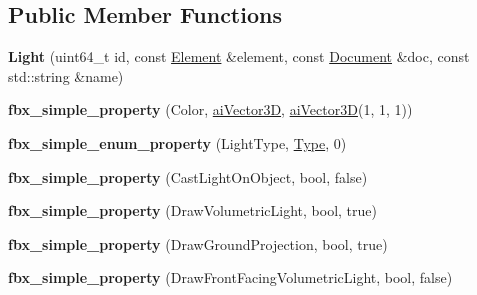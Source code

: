 \subsection*{Public Member Functions}
\begin{DoxyCompactItemize}
\item 
\hypertarget{class_assimp_1_1_f_b_x_1_1_light_a3c9266cb3d4fa03bb780329b565cfc11}{{\bfseries Light} (uint64\+\_\+t id, const \hyperlink{class_assimp_1_1_f_b_x_1_1_element}{Element} \&element, const \hyperlink{class_assimp_1_1_f_b_x_1_1_document}{Document} \&doc, const std\+::string \&name)}\label{class_assimp_1_1_f_b_x_1_1_light_a3c9266cb3d4fa03bb780329b565cfc11}

\item 
\hypertarget{class_assimp_1_1_f_b_x_1_1_light_a427a6078fe274cb5efb602206e0135d5}{{\bfseries fbx\+\_\+simple\+\_\+property} (Color, \hyperlink{structai_vector3_d}{ai\+Vector3\+D}, \hyperlink{structai_vector3_d}{ai\+Vector3\+D}(1, 1, 1))}\label{class_assimp_1_1_f_b_x_1_1_light_a427a6078fe274cb5efb602206e0135d5}

\item 
\hypertarget{class_assimp_1_1_f_b_x_1_1_light_a3b88221cfb2c07b2ec2576f572514727}{{\bfseries fbx\+\_\+simple\+\_\+enum\+\_\+property} (Light\+Type, \hyperlink{struct_type}{Type}, 0)}\label{class_assimp_1_1_f_b_x_1_1_light_a3b88221cfb2c07b2ec2576f572514727}

\item 
\hypertarget{class_assimp_1_1_f_b_x_1_1_light_a91094198204cea8fbcb909033a6ea2bc}{{\bfseries fbx\+\_\+simple\+\_\+property} (Cast\+Light\+On\+Object, bool, false)}\label{class_assimp_1_1_f_b_x_1_1_light_a91094198204cea8fbcb909033a6ea2bc}

\item 
\hypertarget{class_assimp_1_1_f_b_x_1_1_light_a3906babd69314e2191cc7621561eeee1}{{\bfseries fbx\+\_\+simple\+\_\+property} (Draw\+Volumetric\+Light, bool, true)}\label{class_assimp_1_1_f_b_x_1_1_light_a3906babd69314e2191cc7621561eeee1}

\item 
\hypertarget{class_assimp_1_1_f_b_x_1_1_light_ada8a3507ea6ca6f731a57be4e94b28d7}{{\bfseries fbx\+\_\+simple\+\_\+property} (Draw\+Ground\+Projection, bool, true)}\label{class_assimp_1_1_f_b_x_1_1_light_ada8a3507ea6ca6f731a57be4e94b28d7}

\item 
\hypertarget{class_assimp_1_1_f_b_x_1_1_light_a20146d09333c8892f81845c3d6fef16f}{{\bfseries fbx\+\_\+simple\+\_\+property} (Draw\+Front\+Facing\+Volumetric\+Light, bool, false)}\label{class_assimp_1_1_f_b_x_1_1_light_a20146d09333c8892f81845c3d6fef16f}


\end{DoxyCompactItemize}
